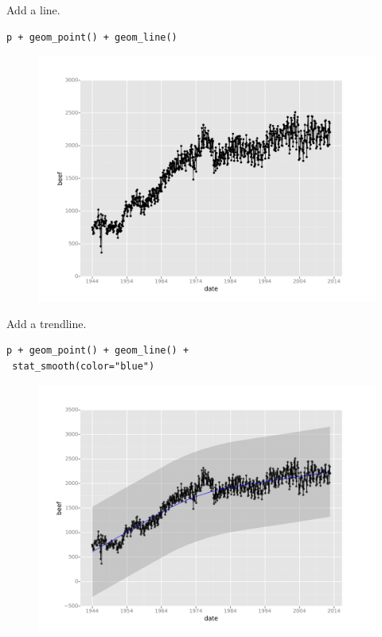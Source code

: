\documentclass{beamer}
\begin{document}
\begin{frame}[fragile]
Add a line.
	\begin{framed}
		\begin{verbatim}
p + geom_point() + geom_line()
		\end{verbatim}
	\end{framed}
	\begin{figure}
		\centering
		\includegraphics[width=0.7\linewidth]{Layers3}
	\end{figure}
	
	
\end{frame}





\begin{frame}[fragile]
Add a trendline.
	\begin{framed}
\begin{verbatim}
p + geom_point() + geom_line() +
 stat_smooth(color="blue")
\end{verbatim}
\end{framed}
\begin{figure}
\centering
\includegraphics[width=0.7\linewidth]{layers4}
\end{figure}
\end{frame}
\end{document}
